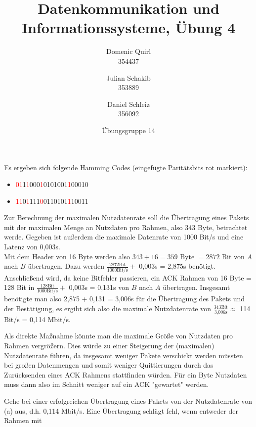 \documentclass{../exercisesheet}
\title{Datenkommunikation und Informationssysteme, Übung 4}
\author{
    Domenic Quirl \\ 354437
    \and
    Julian Schakib \\ 353889
    \and 
    Daniel Schleiz \\ 356092
}
\date{Übungsgruppe 14}
\begin{document}
\maketitle
\pointtable


\begin{exercise}{1}
	Es ergeben sich folgende Hamming Codes (eingefügte Paritätsbits rot markiert):
	\begin{itemize}
	\item \textcolor{red}{01}1\textcolor{red}{1}000\textcolor{red}{1}0101001\textcolor{red}{1}00010
	\item \textcolor{red}{11}0\textcolor{red}{1}111\textcolor{red}{0}0110101\textcolor{red}{1}10011
	\end{itemize}
\end{exercise}

\begin{exercise}{4}
\begin{subexercise}
	Zur Berechnung der maximalen Nutzdatenrate soll die Übertragung eines Pakets mit der maximalen Menge an Nutzdaten pro Rahmen, also 343 Byte, betrachtet werde. Gegeben ist
	außerdem die maximale Datenrate von 1000 Bit/s und eine Latenz von 0,003s. \\
	Mit dem Header von 16 Byte werden also $343+16=359$ Byte $= 2872$ Bit von $A$ nach $B$ übertragen. Dazu werden $\frac{2872 \text{Bit}}{1000 \text{Bit/s}} +$ 0,003s 
	= 2,875s benötigt. Anschließend wird, da keine Bitfehler passieren, ein ACK Rahmen von 16 Byte = 128 Bit in $\frac{128 \text{Bit}}{1000 \text{Bit/s}} +$ 0,003s = 0,131s von
	$B$ nach $A$ übertragen. Insgesamt benötigte man also 2,875 + 0,131 = 3,006s für die Übertragung des Pakets und der Bestätigung, es ergibt sich also die maximale
	Nutzdatenrate von $\frac{343\text{Bit}}{\text{3,006s}}\approx$ 114 Bit/s = 0,114 Mbit/s.
\end{subexercise}
\begin{subexercise}
	Als direkte Maßnahme könnte man die maximale Größe von Nutzdaten pro Rahmen vergrößern. Dies würde zu einer Steigerung der (maximalen) Nutzdatenrate führen, da 
	insgesamt weniger Pakete verschickt werden müssten bei großen Datenmengen und somit weniger Quittierungen durch das Zurücksenden eines ACK Rahmens stattfinden
	würden. Für ein Byte Nutzdaten muss dann also im Schnitt weniger auf ein ACK "gewartet" werden.
\end{subexercise}
\begin{subexercise}
	Gehe bei einer erfolgreichen Übertragung eines Pakets von der Nutzdatenrate von (a) aus, d.h. 0,114 Mbit/s. Eine Übertragung schlägt fehl, wenn entweder der Rahmen mit

\end{subexercise}
\end{exercise}
\end{document}
